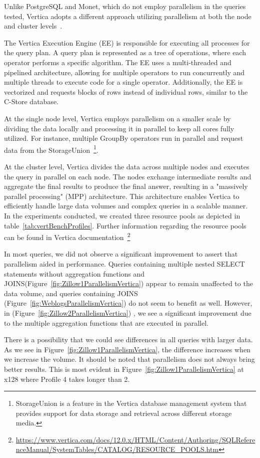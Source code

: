 Unlike PostgreSQL and Monet, which do not employ parallelism in the queries tested, Vertica adopts a different 
approach utilizing parallelism at both the node and cluster levels~\cite{Lamb2012-ch}.\par
The Vertica Execution Engine (EE) is responsible for executing all processes for the query plan. 
A query plan is represented as a tree of operations, where each operator performs a specific algorithm. 
The EE uses a multi-threaded and pipelined architecture, allowing for multiple operators to run 
concurrently and multiple threads to execute code for a single operator. Additionally, the EE is 
vectorized and requests blocks of rows instead of individual rows, similar to the C-Store database.\par
At the single node level, Vertica employs parallelism on a smaller scale by dividing the data locally 
and processing it in parallel to keep all cores fully utilized. For instance, multiple GroupBy operators 
run in parallel and request data from the StorageUnion~\footnote{StorageUnion is a feature in the Vertica database management system that provides support for data storage and retrieval across different storage media.}.\par
At the cluster level, Vertica divides the data across multiple nodes and executes the query in parallel 
on each node. The nodes exchange intermediate results and aggregate the final results to produce the 
final answer, resulting in a "massively parallel processing" (MPP) architecture. This architecture enables 
Vertica to efficiently handle large data volumes and complex queries in a scalable manner. In the experiments 
conducted, we created three resource pools as depicted in table~\ref{tab:vertBenchProfiles}. 
Further information regarding the resource pools can be found in Vertica documentation~\footnote{\url{https://www.vertica.com/docs/12.0.x/HTML/Content/Authoring/SQLReferenceManual/SystemTables/CATALOG/RESOURCE_POOLS.htm}}\par
In most queries, we did not observe a significant improvement to assert that parallelism aided in performance. 
Queries containing multiple nested SELECT statements without aggregation functions and JOINS(Figure~\ref{fig:Zillow1ParallelismVertica}) 
appear to remain unaffected to the data volume, and queries containing JOINS (Figure~\ref{fig:WeblogsParallelismVertica}) do not seem to benefit as well.
However, in (Figure~\ref{fig:Zillow2ParallelismVertica}) , we see a significant improvement due to the multiple aggregation functions that are executed in parallel.\par
There is a possibility that we could see differences in all queries with larger data. As we see in Figure~\ref{fig:Zillow1ParallelismVertica}, the difference increases when we increase the volume. 
It should be noted that parallelism does not always bring better results. This is most evident in Figure~\ref{fig:Zillow1ParallelismVertica} at x128 where Profile 4 takes longer than 2.

